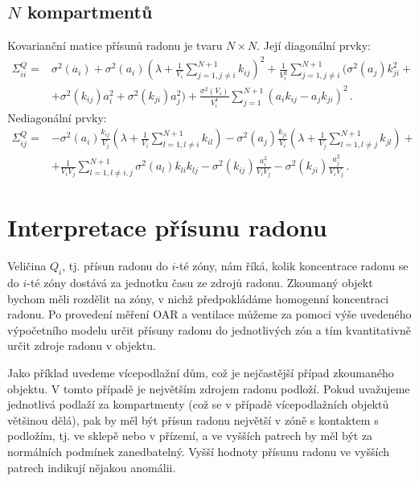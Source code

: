 \subsection{$N$ kompartmentů}
Kovarianční matice přísunů radonu je tvaru $N\times N$. Její diagonální prvky:
\begin{align}
    \Sigma_{ii}^Q=&\sigma^2(\dot{a_i}) + \sigma^2(a_i)\left(\lambda + \frac{1}{V_i}\sum_{j=1,j\neq i}^{N+1}k_{ij}\right)^2 + \frac{1}{V_i^2}\sum_{j=1,j\neq i}^{N+1}\big(\sigma^2(a_j)k_{ji}^2 + \nonumber\\
    &+ \sigma^2(k_{ij})a_i^2 + \sigma^2(k_{ji})a_j^2\big) + \frac{\sigma^2(V_i)}{V_i^4}\sum_{j=1}^{N+1}\left(a_i k_{ij} -a_j k_{ji}\right)^2\,.
    \label{eq:nejistota_Nzon}
\end{align}
Nediagonální prvky:
\begin{align}
    \Sigma_{ij}^Q=&-\sigma^2(a_i)\frac{k_{ij}}{V_j}\left(\lambda + \frac{1}{V_i}\sum_{l=1,l\neq i}^{N+1}k_{il}\right) - \sigma^2(a_j)\frac{k_{ji}}{V_i}\left(\lambda + \frac{1}{V_j}\sum_{l=1,l\neq j}^{N+1}k_{jl}\right)+\nonumber\\
    &+ \frac{1}{V_iV_j}\sum_{l=1,l\neq i,j}^{N+1}\sigma^2(a_l)k_{li}k_{lj} - \sigma^2(k_{ij})\frac{a_i^2}{V_iV_j} - \sigma^2(k_{ji})\frac{a_j^2}{V_iV_j}\,.
\end{align}

\section{Interpretace přísunu radonu}\label{navesti:model_interpretace_Q}
Veličina $Q_i$, tj. přísun radonu do $i$-té zóny, nám říká, kolik koncentrace radonu se do $i$-té zóny dostává za jednotku času ze zdrojů radonu. Zkoumaný objekt bychom měli rozdělit na zóny, v nichž předpokládáme homogenní koncentraci radonu. Po provedení měření OAR a ventilace můžeme za pomoci výše uvedeného výpočetního modelu určit přísuny radonu do jednotlivých zón a tím kvantitativně určit zdroje radonu v objektu.

Jako příklad uvedeme vícepodlažní dům, což je nejčastější případ zkoumaného objektu. V tomto případě je největším zdrojem radonu podloží. Pokud uvažujeme jednotlivá podlaží za kompartmenty (což se v případě vícepodlažních objektů většinou dělá), pak by měl být přísun radonu největší v zóně s kontaktem s podložím, tj. ve sklepě nebo v přízemí, a ve vyšších patrech by měl být za normálních podmínek zanedbatelný. Vyšší hodnoty přísunu radonu ve vyšších patrech indikují nějakou anomálii.

